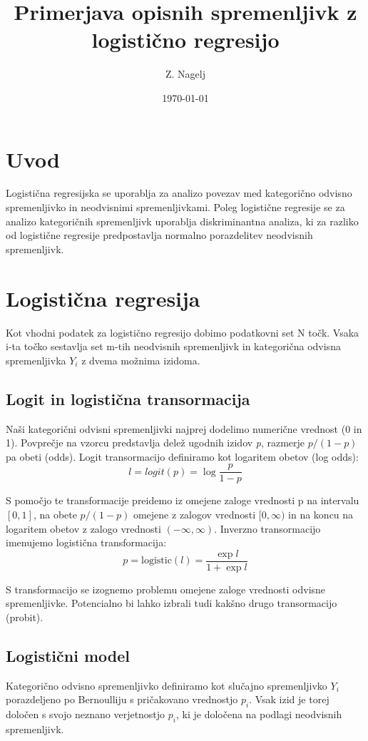 \documentclass[letterpaper,11pt]{article}
\begin{document}



\title{\Large{Primerjava opisnih spremenljivk z logistično regresijo}}
\author{Z. Nagelj}
\date{\today}
\maketitle


\section{Uvod}
Logistična regresijska se uporablja za analizo povezav med kategorično odvisno spremenljivko in neodvisnimi  spremenljivkami. Poleg logistične regresije se za analizo kategoričnih spremenljivk uporablja diskriminantna analiza, ki za razliko od logistične regresije predpostavlja normalno porazdelitev neodvisnih spremenljivk.


\section{Logistična regresija}
Kot vhodni podatek za logistično regresijo dobimo podatkovni set N točk. Vsaka i-ta točko sestavlja set m-tih neodvisnih spremenljivk in kategorična odvisna spremenljivka $Y_i$ z dvema možnima izidoma.


\subsection{Logit in logistična transormacija}
Naši kategorični odvisni spremenljivki najprej dodelimo numerične vrednost (0 in 1). Povprečje na vzorcu predstavlja delež ugodnih izidov \emph{p}, razmerje $p/(1-p)$ pa obeti (odds). Logit transormacijo  definiramo kot logaritem obetov (log odds):
$$l = logit(p) = \log{\frac{p}{1-p}} $$

\noindent S pomočjo te transformacije preidemo iz omejene zaloge vrednosti p na intervalu $[0,1]$, na obete $p/(1-p)$ omejene z zalogov vrednosti $[0, \infty)$ in na koncu na logaritem obetov z zalogo vrednosti $(-\infty, \infty)$. Inverzno transormacijo imenujemo logistična transformacija:
$$p = \text{logistic}(l)=\frac{\exp{l}}{1 + \exp{l}}$$

\noindent S transformacijo se izognemo problemu omejene zaloge vrednosti odvisne spremenljivke. Potencialno bi lahko izbrali tudi kakšno drugo transormacijo (probit).

\subsection{Logistični model}
Kategorično odvisno spremenljivko definiramo kot slučajno spremenljivko $Y_i$porazdeljeno po Bernoulliju s pričakovano vrednostjo $p_i$. Vsak izid je torej določen s svojo neznano verjetnostjo $p_i$, ki je določena na podlagi neodvisnih spremenljivk.
\newpage
\end{document}
